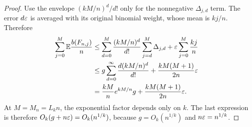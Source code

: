 \begin{proof}
Use the envelope \((kM/n)^d/d!\) only for the nonnegative
\(\Delta_{j,d}\) term. The error \(d\varepsilon\) is averaged with its original
binomial weight, whose mean is \(kj/n\). Therefore
\begin{align}
 \sum_{j=0}^{M}\mathbb E\frac{b(F_{n,j})}{n}
 &\le
 \sum_{d=0}^{M}\frac{(kM/n)^d}{d!}
       \sum_{j=d}^{M}\Delta_{j,d}
       +\varepsilon\sum_{j=0}^{M}\frac{kj}{n}\notag\\
 &\le
 g\sum_{d=0}^{\infty}\frac{d(kM/n)^d}{d!}
       +\frac{kM(M+1)}{2n}\varepsilon\notag\\
 &=\frac{kM}{n}e^{kM/n}g+\frac{kM(M+1)}{2n}\varepsilon.
 \label{eq:forcing-general-cap}
\end{align}
At \(M=M_n=L_kn\), the exponential factor depends only on \(k\).
The last expression is therefore \(O_k(g+n\varepsilon)=O_k(n^{1/k})\),
because \(g=O_k(n^{1/k})\) and \(n\varepsilon=n^{1/k}\).
\end{proof}

